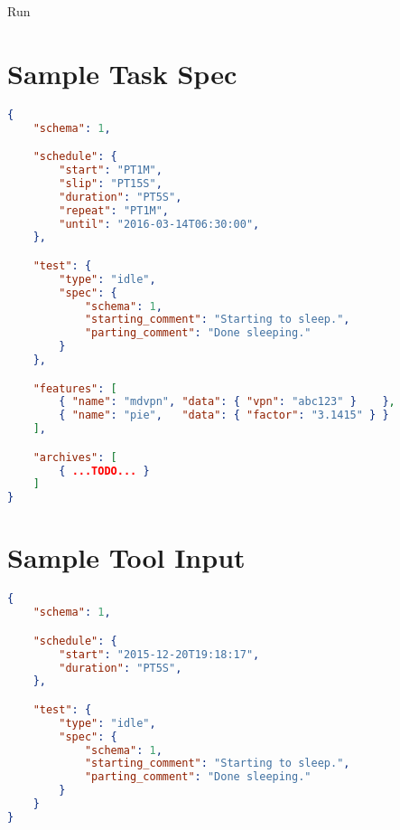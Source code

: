 \documentclass[10pt]{article}
\begin{document}
%
%
\begin{msc}{Run}
\parts


\nextlevel[3]






\end{msc}



\section{Sample Task Spec}

\begin{lstlisting}[language=json,firstnumber=1]
{
    "schema": 1,

    "schedule": {
        "start": "PT1M",
        "slip": "PT15S",
        "duration": "PT5S",
        "repeat": "PT1M",
        "until": "2016-03-14T06:30:00",
    },

    "test": {
        "type": "idle",
        "spec": {
            "schema": 1,
            "starting_comment": "Starting to sleep.",
            "parting_comment": "Done sleeping."
        }
    },

    "features": [
        { "name": "mdvpn", "data": { "vpn": "abc123" }    },
        { "name": "pie",   "data": { "factor": "3.1415" } }
    ],

    "archives": [
        { ...TODO... }
    ]
}
\end{lstlisting}


\section{Sample Tool Input}

\begin{lstlisting}[language=json,firstnumber=1]
{
    "schema": 1,

    "schedule": {
        "start": "2015-12-20T19:18:17",
        "duration": "PT5S",
    },

    "test": {
        "type": "idle",
        "spec": {
            "schema": 1,
            "starting_comment": "Starting to sleep.",
            "parting_comment": "Done sleeping."
        }
    }
}
\end{lstlisting}
\end{document}
